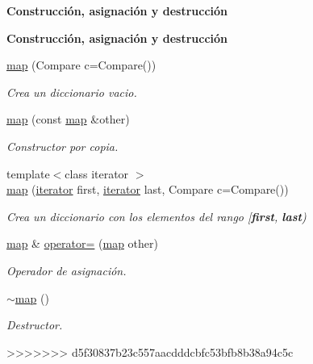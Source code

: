 \begin{Indent}{\bf \-Construcción, asignación y destrucción}
\begin{Indent}\textbf{ Construcción, asignación y destrucción}\par
\begin{DoxyCompactItemize}
\item 
\hyperlink{classaed2_1_1iterator_ab55f7bc4639e905d66935b56995a5b1f_ab55f7bc4639e905d66935b56995a5b1f}{map} (Compare c=Compare())
\begin{DoxyCompactList}\small\item\em Crea un diccionario vacio. \end{DoxyCompactList}\item 
\hyperlink{classaed2_1_1iterator_aee42bcaf809b71168f4266e1d05971e2_aee42bcaf809b71168f4266e1d05971e2}{map} (const \hyperlink{classaed2_1_1map}{map} \&other)
\begin{DoxyCompactList}\small\item\em Constructor por copia. \end{DoxyCompactList}\item 
{\footnotesize template$<$class iterator $>$ }\\\hyperlink{classaed2_1_1iterator_aa44ca788a300603c5fae2d192e11f249_aa44ca788a300603c5fae2d192e11f249}{map} (\hyperlink{classaed2_1_1iterator_1_1iterator}{iterator} first, \hyperlink{classaed2_1_1iterator_1_1iterator}{iterator} last, Compare c=Compare())
\begin{DoxyCompactList}\small\item\em Crea un diccionario con los elementos del rango \mbox{[}{\bfseries first}, {\bfseries last}) \end{DoxyCompactList}\item 
\hyperlink{classaed2_1_1map}{map} \& \hyperlink{classaed2_1_1iterator_a7cafd02350b04f7546fa29c17168c18b_a7cafd02350b04f7546fa29c17168c18b}{operator=} (\hyperlink{classaed2_1_1map}{map} other)
\begin{DoxyCompactList}\small\item\em Operador de asignación. \end{DoxyCompactList}\item 
\hyperlink{classaed2_1_1iterator_a769d0ae1a1c7ed66acdd321e44fcd0e1_a769d0ae1a1c7ed66acdd321e44fcd0e1}{$\sim$map} ()
\begin{DoxyCompactList}\small\item\em Destructor. \end{DoxyCompactList}\end{DoxyCompactItemize}
>>>>>>> d5f30837b23c557aacdddcbfc53bfb8b38a94c5c
\end{Indent}

\end{Indent}

